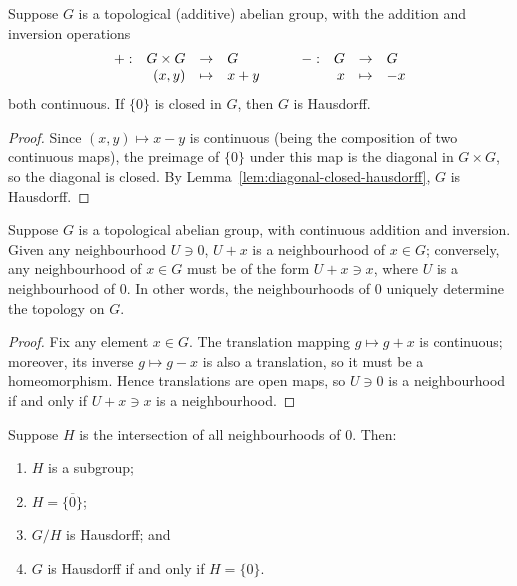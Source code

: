 \begin{lemma}\label{lem:0-closed-hausdorff}
    Suppose \(G\) is a topological (additive) abelian group,
    with the addition and inversion operations
    \begin{equation*}
        \begin{array}{rrcl} {+}: & {G \times G} &\to & {G} \\ & {(x,y)} &\mapsto & {x+y} \end{array} \qquad \begin{array}{rrcl} {-}: & {G} &\to & {G} \\ & {x} &\mapsto & {-x} \end{array}
    \end{equation*}
    both continuous.
    If \(\{0\}\) is closed in \(G\), then \(G\) is Hausdorff.
\end{lemma}
\begin{proof}
    Since \((x,y) \mapsto x-y\) is continuous (being the composition of two continuous maps),
    the preimage of \(\{0\}\) under this map is the diagonal in \(G \times G\),
    so the diagonal is closed.
    By Lemma~\ref{lem:diagonal-closed-hausdorff}, \(G\) is Hausdorff.
\end{proof}
\begin{lemma}
    Suppose \(G\) is a topological abelian group, with continuous addition and inversion.
    Given any neighbourhood \(U \ni 0\), \(U + x\) is a neighbourhood of \(x \in G\);
    conversely, any neighbourhood of \(x \in G\) must be of the form \(U + x \ni x\),
    where \(U\) is a neighbourhood of 0.
    In other words, the neighbourhoods of 0 uniquely determine the topology on \(G\).
\end{lemma}
\begin{proof}
    Fix any element \(x \in G\).
    The translation mapping \(g \mapsto g+x\) is continuous;
    moreover, its inverse \(g \mapsto g-x\) is also a translation, so it must be a homeomorphism.
    Hence translations are open maps, so \(U \ni 0\) is a neighbourhood if and only if \(U + x \ni x\) is a neighbourhood.
\end{proof}
\begin{lemma}
    Suppose \(H\) is the intersection of all neighbourhoods of 0.
    Then:
    \begin{enumerate}[label={(\alph*)}, itemsep=0mm]
        \item \(H\) is a subgroup;
        \item \(H = \overline{\{0\}}\);
        \item \(G/H\) is Hausdorff; and
        \item \(G\) is Hausdorff if and only if \(H = \{0\}\).
    \end{enumerate}
\end{lemma}
